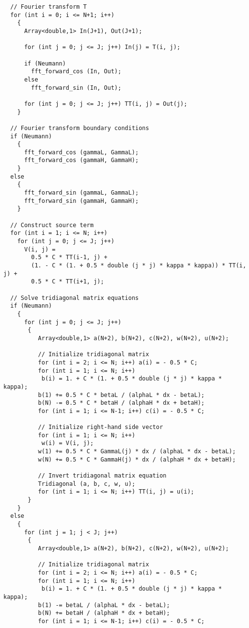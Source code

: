 {\begin{verbatim}
  // Fourier transform T  
  for (int i = 0; i <= N+1; i++)
    {
      Array<double,1> In(J+1), Out(J+1);

      for (int j = 0; j <= J; j++) In(j) = T(i, j);

      if (Neumann)
        fft_forward_cos (In, Out);
      else
        fft_forward_sin (In, Out);

      for (int j = 0; j <= J; j++) TT(i, j) = Out(j);
    }

  // Fourier transform boundary conditions
  if (Neumann)
    {
      fft_forward_cos (gammaL, GammaL);
      fft_forward_cos (gammaH, GammaH);
    }
  else
    {
      fft_forward_sin (gammaL, GammaL);
      fft_forward_sin (gammaH, GammaH);
    }

  // Construct source term
  for (int i = 1; i <= N; i++)
    for (int j = 0; j <= J; j++) 
      V(i, j) = 
        0.5 * C * TT(i-1, j) + 
        (1. - C * (1. + 0.5 * double (j * j) * kappa * kappa)) * TT(i, j) +
        0.5 * C * TT(i+1, j);
     
  // Solve tridiagonal matrix equations
  if (Neumann)
    {
      for (int j = 0; j <= J; j++)
       {  
          Array<double,1> a(N+2), b(N+2), c(N+2), w(N+2), u(N+2);

          // Initialize tridiagonal matrix
          for (int i = 2; i <= N; i++) a(i) = - 0.5 * C;
          for (int i = 1; i <= N; i++)
           b(i) = 1. + C * (1. + 0.5 * double (j * j) * kappa * kappa);
          b(1) += 0.5 * C * betaL / (alphaL * dx - betaL);
          b(N) -= 0.5 * C * betaH / (alphaH * dx + betaH);
          for (int i = 1; i <= N-1; i++) c(i) = - 0.5 * C;
	  
          // Initialize right-hand side vector
          for (int i = 1; i <= N; i++)
           w(i) = V(i, j);
          w(1) += 0.5 * C * GammaL(j) * dx / (alphaL * dx - betaL);
          w(N) += 0.5 * C * GammaH(j) * dx / (alphaH * dx + betaH);
	  
          // Invert tridiagonal matrix equation
          Tridiagonal (a, b, c, w, u);
          for (int i = 1; i <= N; i++) TT(i, j) = u(i);
       }
    }
  else
    {
      for (int j = 1; j < J; j++)
       { 
          Array<double,1> a(N+2), b(N+2), c(N+2), w(N+2), u(N+2);

          // Initialize tridiagonal matrix
          for (int i = 2; i <= N; i++) a(i) = - 0.5 * C;
          for (int i = 1; i <= N; i++)
           b(i) = 1. + C * (1. + 0.5 * double (j * j) * kappa * kappa);
          b(1) -= betaL / (alphaL * dx - betaL);
          b(N) += betaH / (alphaH * dx + betaH);
          for (int i = 1; i <= N-1; i++) c(i) = - 0.5 * C;
	  

\end{verbatim}}
